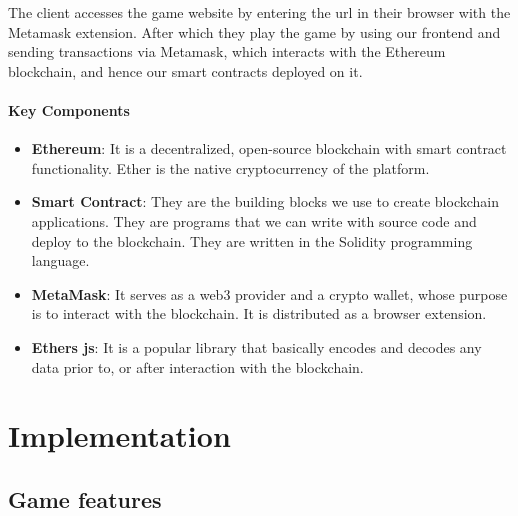 \documentclass{article}
\begin{document}
The client accesses the game website by entering the url in their browser with the Metamask extension. 
After which they play the game by using our frontend and sending transactions via Metamask, which interacts with the Ethereum blockchain, and hence our smart contracts deployed on it.

\paragraph{Key Components}
\begin{itemize}
\item[] \textbf{Ethereum}: It is a decentralized, open-source blockchain with smart contract functionality. Ether is the native cryptocurrency of the platform.
\item[] \textbf{Smart Contract}: They are the building blocks we use to create blockchain applications. They are programs that we can write with source code and deploy to the blockchain. They are written in the Solidity programming language. 
\item[] \textbf{MetaMask}: It serves as a web3 provider and a crypto wallet, whose purpose is to interact with the blockchain. It is distributed as a browser extension. 
\item[] \textbf{Ethers js}: It is a popular library that basically encodes and decodes any data prior to, or after interaction with the blockchain.

\end{itemize}



\section{Implementation}

\subsection{Game features}
\end{document}
